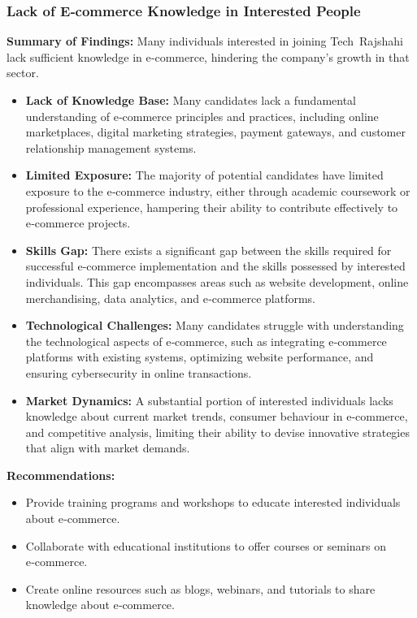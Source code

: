 \documentclass[12pt,a4paper]{article}
\begin{document}
\subsubsection{Lack of E‑commerce Knowledge in Interested People}
\textbf{Summary of Findings:} Many individuals interested in joining Tech Rajshahi lack sufficient knowledge in e‑commerce, hindering the company’s growth in that sector.
\begin{itemize}
    \item \textbf{Lack of Knowledge Base:} Many candidates lack a fundamental understanding of e‑commerce principles and practices, including online marketplaces, digital marketing strategies, payment gateways, and customer relationship management systems.
    \item \textbf{Limited Exposure:} The majority of potential candidates have limited exposure to the e‑commerce industry, either through academic coursework or professional experience, hampering their ability to contribute effectively to e‑commerce projects.
    \item \textbf{Skills Gap:} There exists a significant gap between the skills required for successful e‑commerce implementation and the skills possessed by interested individuals.  This gap encompasses areas such as website development, online merchandising, data analytics, and e‑commerce platforms.
    \item \textbf{Technological Challenges:} Many candidates struggle with understanding the technological aspects of e‑commerce, such as integrating e‑commerce platforms with existing systems, optimizing website performance, and ensuring cybersecurity in online transactions.
    \item \textbf{Market Dynamics:} A substantial portion of interested individuals lacks knowledge about current market trends, consumer behaviour in e‑commerce, and competitive analysis, limiting their ability to devise innovative strategies that align with market demands.
\end{itemize}
\textbf{Recommendations:}
\begin{itemize}
    \item Provide training programs and workshops to educate interested individuals about e‑commerce.
    \item Collaborate with educational institutions to offer courses or seminars on e‑commerce.
    \item Create online resources such as blogs, webinars, and tutorials to share knowledge about e‑commerce.
\end{itemize}
\end{document}
